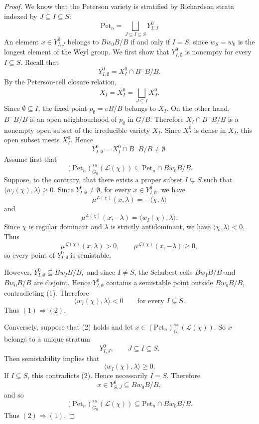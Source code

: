 \documentclass[12pt, reqno]{amsart}
\theoremstyle{plain}
\numberwithin{equation}{section}
\theoremstyle{definition}
\begin{document}
\begin{proof}
We know that the Peterson variety is stratified by Richardson strata indexed by $J \subseteq I \subseteq S$:
\[ \mathrm{Pet}_{n} = \bigsqcup_{J \subseteq I \subseteq S} Y^{0}_{I,J} \]
An element $x \in Y^0_{I,J}$ belongs to $Bw_{0}B/B$ if and only if $I = S$, since $w_{S} = w_0$ is the longest element of the Weyl group. 
 We first show that \(Y^0_{I,\emptyset}\) is nonempty for every \(I\subseteq S\).
Recall that
\[
Y^0_{I,\emptyset}
=
X_I^0\cap B^-B/B.
\]
By the Peterson-cell closure relation,
\[
X_I=\overline{X_I^0}
=
\bigsqcup_{J\subseteq I}X_J^0.
\]
Since \(\emptyset\subseteq I\), the fixed point $p_\emptyset=eB/B$
belongs to \(X_I\). On the other hand, \(B^-B/B\) is an open
neighbourhood of \(p_\emptyset\) in \(G/B\). Therefore $X_I\cap B^-B/B$ is a nonempty open subset of the irreducible variety \(X_I\).
Since \(X_I^0\) is dense in \(X_I\), this open subset meets \(X_I^0\).
Hence
\[
Y^0_{I,\emptyset}
=
X_I^0\cap B^-B/B
\neq\emptyset.
\]
Assume first that
\[
(\mathrm{Pet}_n)^{ss}_{G_0}(\mathcal L(\chi))
\subseteq
\mathrm{Pet}_n\cap Bw_0B/B.
\]
Suppose, to the contrary, that there exists a proper subset
\(I\subsetneq S\) such that $\langle w_I(\chi),\lambda\rangle\ge0.$ Since $Y^0_{I,\emptyset}\neq\emptyset$, for every \(x\in Y^0_{I,\emptyset}\), we have 
\[
\mu^{\mathcal L(\chi)}(x,\lambda)
=
-\langle\chi,\lambda\rangle
\]
and
\[
\mu^{\mathcal L(\chi)}(x,-\lambda)
=
\langle w_I(\chi),\lambda\rangle.
\]
Since \(\chi\) is regular dominant and \(\lambda\) is strictly
antidominant, we have $\langle\chi,\lambda\rangle<0.$
Thus
\[
\mu^{\mathcal L(\chi)}(x,\lambda)>0,
\qquad
\mu^{\mathcal L(\chi)}(x,-\lambda)\ge0,
\]
so every point of \(Y^0_{I,\emptyset}\) is semistable.

However, $Y^0_{I,\emptyset}\subseteq Bw_IB/B,$
and since \(I\neq S\), the Schubert cells \(Bw_IB/B\) and
\(Bw_0B/B\) are disjoint. Hence \(Y^0_{I,\emptyset}\) contains a
semistable point outside \(Bw_0B/B\), contradicting (1). Therefore
\[
\langle w_I(\chi),\lambda\rangle<0
\qquad
\text{for every }I\subsetneq S.
\]
Thus \((1)\Rightarrow(2)\).

Conversely, suppose that (2) holds and let $x\in(\mathrm{Pet}_n)^{ss}_{G_0}(\mathcal L(\chi)).$
So \(x\) belongs to a unique
stratum
\[
Y^0_{I,J},
\qquad
J\subseteq I\subseteq S.
\]
Then semistability implies that 
\[
\langle w_I(\chi),\lambda\rangle\ge0.
\]
If \(I\subsetneq S\), this contradicts (2). Hence necessarily $I=S.$ Therefore
\[
x\in Y^0_{S,J}\subseteq Bw_0B/B,
\]
and so
\[
(\mathrm{Pet}_n)^{ss}_{G_0}(\mathcal L(\chi))
\subseteq
\mathrm{Pet}_n\cap Bw_0B/B.
\]
Thus \((2)\Rightarrow(1)\).


\end{proof}
\end{document}
